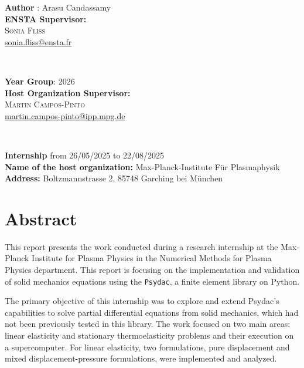 \documentclass[a4paper,12pt,twoside]{report}
\begin{document}
\begin{minipage}[t]{0.5\textwidth}
	\begin{flushleft} 
    \textbf{Author} : Arasu Candassamy \\
    \vspace{1cm}
	\textbf{ENSTA Supervisor:}\\
	\textsc{Sonia Fliss}\\
	\href{mailto:sonia.fliss@ensta.fr}{sonia.fliss@ensta.fr}
	\end{flushleft}
\end{minipage}
~
\begin{minipage}[t]{0.4\textwidth}
	\begin{flushright} 
    \textbf{Year Group}: 2026 \\
    \vspace{1cm}
	\textbf{Host Organization Supervisor:}\\
	\textsc{Martin Campos-Pinto}\\
	\href{mailto:martin.campos-pinto@ipp.mpg.de}{martin.campos-pinto@ipp.mpg.de}\\
	\end{flushright}
\end{minipage} \\

\vspace{1cm}

\begin{center}
    \textbf{Internship} from 26/05/2025 to 22/08/2025\\
\textbf{Name of the host organization:} Max-Planck-Institute Für Plasmaphysik\\
\textbf{Address:} Boltzmannstrasse 2, 85748 Garching bei München
\end{center}


\newpage\null

\newpage
\section*{Abstract}

This report presents the work conducted during a research internship at the Max-Planck Institute for Plasma Physics in the Numerical Methods for Plasma Physics department. This report is focusing on the implementation and validation of solid mechanics equations using the \texttt{Psydac}, a finite element library on Python.

The primary objective of this internship was to explore and extend Psydac's capabilities to solve partial differential equations from solid mechanics, which had not been previously tested in this library. The work focused on two main areas: linear elasticity and stationary thermoelasticity problems and their execution on a supercomputer. For linear elasticity, two formulations, pure displacement and mixed displacement-pressure formulations, were implemented and analyzed. 
\end{document}
